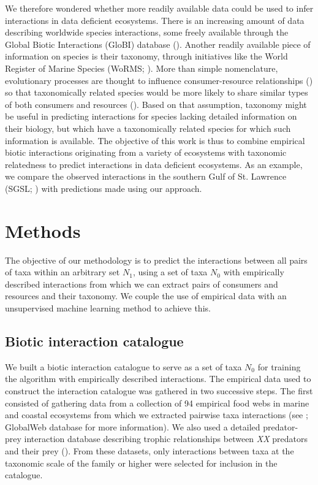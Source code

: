 \documentclass[letterpaper]{article}
\begin{document}
We therefore wondered whether more readily available data could be used to infer interactions in data deficient ecosystems. There is an increasing amount of data describing worldwide species interactions, some freely available through the Global Biotic Interactions (GloBI) database (\cite{Poelen2014}). Another readily available piece of information on species is their taxonomy, through initiatives like the World Register of Marine Species (WoRMS; \cite{WoRMS2016}). More than simple nomenclature, evolutionary processes are thought to influence consumer-resource relationships (\cite{Mouquet2012, Rohr2014}) so that taxonomically related species would be more likely to share similar types of both consumers and resources (\cite{Eklof2012, Morales-Castilla2015, Gray2015}). Based on that assumption, taxonomy might be useful in predicting interactions for species lacking detailed information on their biology, but which have a taxonomically related species for which such information is available. The objective of this work is thus to combine empirical biotic interactions originating from a variety of ecosystems with taxonomic relatedness to predict interactions in data deficient ecosystems. As an example, we compare the observed interactions in the southern Gulf of St. Lawrence (SGSL; \cite{Savenkoff2004}) with predictions made using our approach.

\section{Methods}
The objective of our methodology is to predict the interactions between all pairs of taxa within an arbitrary set $N_1$, using a set of taxa $N_0$ with empirically described interactions from which we can extract pairs of consumers and resources and their taxonomy. We couple the use of empirical data with an unsupervised machine learning method to achieve this.

 \subsection{Biotic interaction catalogue}

We built a biotic interaction catalogue to serve as a set of taxa $N_0$ for training the algorithm with empirically described interactions. The empirical data used to construct the interaction catalogue was gathered in two successive steps. The first consisted of gathering data from a collection of 94 empirical food webs in marine and coastal ecosystems from which we extracted pairwise taxa interactions (see \cite{Brose2005, Kortsch2015}; GlobalWeb database for more information). We also used a detailed predator-prey interaction database describing trophic relationships between \textit{XX} predators and their prey (\cite{Barnes2008}). From these datasets, only interactions between taxa at the taxonomic scale of the family or higher were selected for inclusion in the catalogue.
\end{document}
